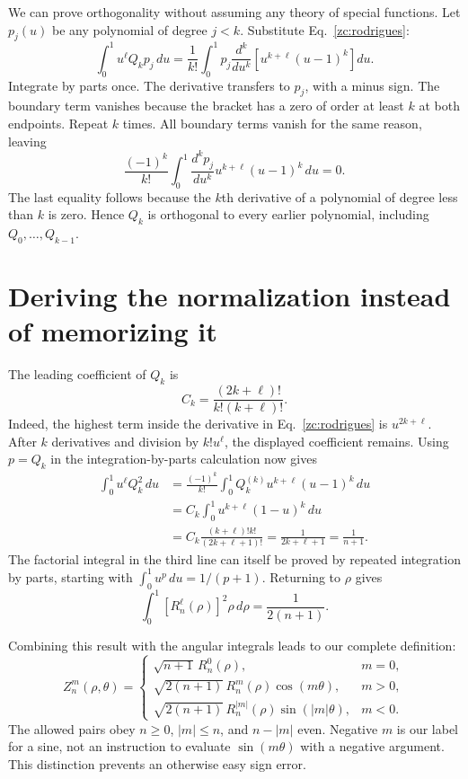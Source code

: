 We can prove orthogonality without assuming any theory of special
functions. Let $p_j(u)$ be any polynomial of degree $j<k$. Substitute
Eq.~\eqref{zc:rodrigues}:
\begin{equation}
 \int_0^1u^\ell Q_k p_j\,du
 =\frac1{k!}\int_0^1p_j
        \frac{d^k}{du^k}\left[u^{k+\ell}(u-1)^k\right]du.
\end{equation}
Integrate by parts once. The derivative transfers to $p_j$, with a minus
sign. The boundary term vanishes because the bracket has a zero of
order at least $k$ at both endpoints. Repeat $k$ times. All boundary
terms vanish for the same reason, leaving
\begin{equation}
 \frac{(-1)^k}{k!}\int_0^1
       \frac{d^kp_j}{du^k}u^{k+\ell}(u-1)^k\,du=0.
\end{equation}
The last equality follows because the $k$th derivative of a polynomial
of degree less than $k$ is zero. Hence $Q_k$ is orthogonal to every
earlier polynomial, including $Q_0,\ldots,Q_{k-1}$.

\section{Deriving the normalization instead of memorizing it}
The leading coefficient of $Q_k$ is
\begin{equation}
 C_k=\frac{(2k+\ell)!}{k!(k+\ell)!}.
\end{equation}
Indeed, the highest term inside the derivative in
Eq.~\eqref{zc:rodrigues} is $u^{2k+\ell}$. After $k$ derivatives
and division by $k!u^\ell$, the displayed coefficient remains.
Using $p=Q_k$ in the integration-by-parts calculation now gives
\begin{align}
 \int_0^1u^\ell Q_k^2\,du
 &=\frac{(-1)^k}{k!}\int_0^1Q_k^{(k)}
                       u^{k+\ell}(u-1)^k\,du\\
 &=C_k\int_0^1u^{k+\ell}(1-u)^k\,du\\
 &=C_k\frac{(k+\ell)!k!}{(2k+\ell+1)!}
   =\frac1{2k+\ell+1}=\frac1{n+1}.
\end{align}
The factorial integral in the third line can itself be proved by
repeated integration by parts, starting with
$\int_0^1u^p\,du=1/(p+1)$. Returning to $\rho$ gives
\begin{equation}
 \int_0^1[R_n^\ell(\rho)]^2\rho\,d\rho=\frac1{2(n+1)}.
 \label{zc:radialnorm}
\end{equation}

Combining this result with the angular integrals leads to our complete
definition:
\begin{equation}
 \boxed{Z_n^m(\rho,\theta)=
 \begin{cases}
 \sqrt{n+1}\,R_n^0(\rho),&m=0,\\
 \sqrt{2(n+1)}\,R_n^m(\rho)\cos(m\theta),&m>0,\\
 \sqrt{2(n+1)}\,R_n^{|m|}(\rho)\sin(|m|\theta),&m<0.
 \end{cases}}
 \label{zc:definition}
\end{equation}
The allowed pairs obey $n\geq0$, $|m|\leq n$, and $n-|m|$ even.
Negative $m$ is our label for a sine, not an instruction to evaluate
$\sin(m\theta)$ with a negative argument. This distinction prevents an
otherwise easy sign error.

